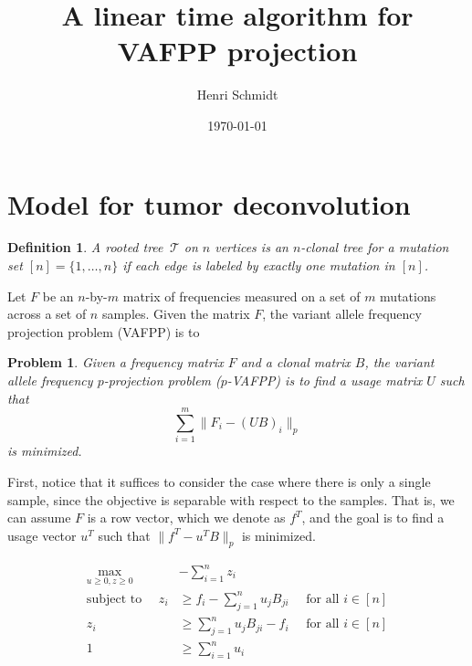 \documentclass[11pt]{article}
\title{A linear time algorithm for VAFPP projection}
\author{Henri Schmidt}
\date{\today}
\newtheorem{definition}{Definition}
\newtheorem{problem}{Problem}
\newcommand{\tree}{\mathcal{T}}
\begin{document}
\maketitle

\section{Model for tumor deconvolution}

\begin{definition}
  A rooted tree $\,\tree$ on $n$ vertices is an $n$-clonal tree 
  for a mutation set $[n] = \{1, \ldots, n\}$ if each edge is
  labeled by exactly one mutation in $[n]$.
\end{definition}

Let $F$ be an $n$-by-$m$ matrix of frequencies measured on
a set of $m$ mutations across a set of $n$ samples. Given the
matrix $F$, the variant allele frequency projection problem (VAFPP) is to

\begin{problem}
  \label{prob:vafpp}
  Given a frequency matrix $F$ and a clonal matrix $B$, the 
  \emph{variant allele frequency $p$-projection problem} ($p$-VAFPP) is to
  find a usage matrix $U$ such that 
  \begin{equation}
    \sum_{i=1}^m\lVert F_i - (UB)_i \rVert_p
  \end{equation}
  is minimized.
\end{problem}

First, notice that it suffices to consider the case where there is only a
single sample, since the objective is separable with respect to the samples. 
That is, we can assume $F$ is a row vector, which we denote as $f^T$, and the
goal is to find a usage vector $u^T$ such that $\lVert f^T - u^TB \rVert_p$ is minimized.

\begin{mdframed}
\begin{align}
  \max_{u \geq 0, z \geq 0} &-\sum_{i=1}^n z_i \nonumber \\
  \text{subject to }\quad z_i &\geq f_i - \sum_{j=1}^n u_j B_{ji} \quad\text{ for all } i \in [n] \label{eq:constr1} \\
  z_i &\geq \sum_{j=1}^n u_j B_{ji} - f_i \quad\text{ for all } i \in [n] \label{eq:constr2} \\
  1 &\geq \sum_{i=1}^n u_i \label{eq:constr3}
\end{align}
\end{mdframed}
\end{document}
